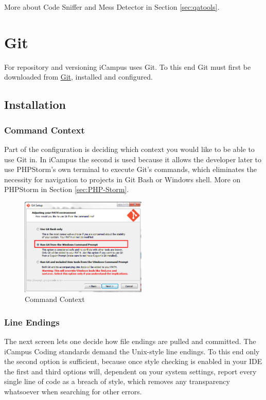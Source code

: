 \documentclass[]{report}
\begin{document}
\noindent
More about Code Sniffer and Mess Detector in Section \ref{sec:qatools}.

\newpage

\section{Git}

For repository and versioning iCampus uses Git. To this end Git must first be downloaded from \href{http://git-scm.com/downloads}{Git}, installed and configured.

\subsection{Installation}

\subsubsection{Command Context}
Part of the configuration is deciding which context you would like to be able to use Git in. In iCampus the second is used because it allows the developer later to use PHPStorm's own terminal to execute Git's commands, which eliminates the necessity for navigation to projects in Git Bash or Windows shell. More on PHPStorm in Section \ref{sec:PHP-Storm}.\\

\begin{figure}[h] 
  \centering
     \includegraphics[width=6cm]{gitbash1.jpg}
  \caption{Command Context}
\end{figure}

\subsubsection{Line Endings}

The next screen lets one decide how file endings are pulled and committed. The iCampus Coding standards demand the Unix-style line endings. To this end only the second option is sufficient, because once style checking is enabled in your IDE the first and third options will, dependent on your system settings, report every single line of code as a breach of style, which removes any transparency whatsoever when searching for other errors.\\
\end{document}
